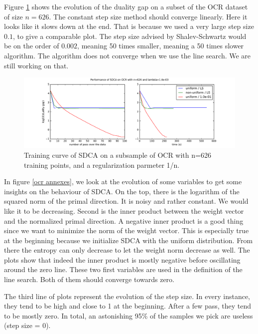 \documentclass{article}
\DeclareMathOperator{\1}{\mathbb{1}}
\begin{document}
Figure \ref{training crf} shows the evolution of the duality gap on a subset  of  the OCR dataset  of size $n=626$.
The constant step size method should converge linearly.
Here it looks like it slows down at the end.
That is because we used a very large step size $0.1$, to give a comparable plot.
The step size advised by Shalev-Schwartz would be on the order of $0.002$, meaning 50 times smaller, meaning a 50 times slower algorithm.
The algorithm does not converge when we use the line search.
We are still working on that.

\begin{figure}[ht]
	\center
	\includegraphics[width=\textwidth]{images/20170922_002857_ocr_perf.pdf}
	\caption{Training curve of SDCA on a subsample of OCR with n=626 training points, and a regularization parmeter 1/n.}
	\label{training crf}
\end{figure}

In figure \ref{ocr annexes}, we look at the evolution of some variables to get some insights on the behaviour of SDCA. 
On the top, there is the logarithm of the squared norm of the primal direction.
It is noisy and rather constant. 
We would like it to be decreasing.
Second is the inner product between the weight vector and the normalized primal direction.
A negative inner product is a good thing since we want to minimize the norm of the weight vector.
This is especially true at the beginning because we initialize SDCA with the uniform distribution.
From there the entropy can only decrease to let the weight norm decrease as well.
The plots show that indeed the inner product is mostly negative before oscillating around the zero line. 
These two first variables are used in the definition of the line search.
Both of them should converge towards zero.

The third line of plots represent the evolution of the step size.
In every instance, they tend to be high and close to 1 at the beginning.
After a few pass, they tend to be mostly zero.
In total, an astonishing 95\% of the samples we pick are useless (step size = 0).
\end{document}
